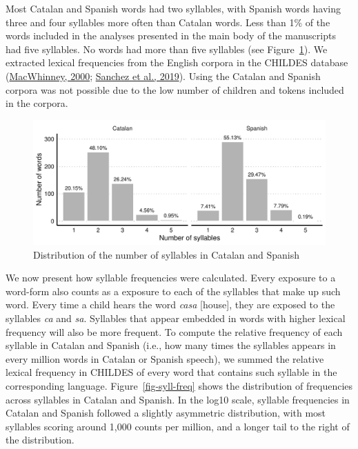 \documentclass[
]{article}
\begin{document}
Most Catalan and Spanish words had two syllables, with Spanish words
having three and four syllables more often than Catalan words. Less than
1\% of the words included in the analyses presented in the main body of
the manuscripts had five syllables. No words had more than five
syllables (see Figure~\ref{fig-syll-number}). We extracted lexical
frequencies from the English corpora in the CHILDES database
(\protect\hyperlink{ref-macwhinney2000childes}{MacWhinney, 2000};
\protect\hyperlink{ref-sanchez2019childesdb}{Sanchez et al., 2019}).
Using the Catalan and Spanish corpora was not possible due to the low
number of children and tokens included in the corpora.

\begin{figure}

{\centering \includegraphics{appendix_files/figure-pdf/fig-syll-number-1.pdf}

}

\caption{\label{fig-syll-number}Distribution of the number of syllables
in Catalan and Spanish}

\end{figure}

We now present how syllable frequencies were calculated. Every exposure
to a word-form also counts as a exposure to each of the syllables that
make up such word. Every time a child hears the word \emph{casa}
{[}house{]}, they are exposed to the syllables \emph{ca} and \emph{sa}.
Syllables that appear embedded in words with higher lexical frequency
will also be more frequent. To compute the relative frequency of each
syllable in Catalan and Spanish (i.e., how many times the syllables
appears in every million words in Catalan or Spanish speech), we summed
the relative lexical frequency in CHILDES of every word that contains
such syllable in the corresponding language. Figure~\ref{fig-syll-freq}
shows the distribution of frequencies across syllables in Catalan and
Spanish. In the log10 scale, syllable frequencies in Catalan and Spanish
followed a slightly asymmetric distribution, with most syllables scoring
around 1,000 counts per million, and a longer tail to the right of the
distribution.
\end{document}

